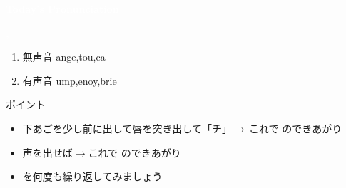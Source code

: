 \documentclass[aspectratio=169,xcolor={dvipsnames,table}]{beamer}
\begin{document}
\begin{frame}
\centering
  \textcolor{white}{\Huge\bfseries Today's Pronunciation}\pause

 \vspace{30pt}

  \textcolor{white}{\Huge\bfseries {}, }
\end{frame}
 \begin{frame}[plain]{}

\large

\begin{enumerate}
 \item  無声音 \hspace{20pt}ange,\hspace{1\zw}tou,\hspace{1\zw}ca
 \item  有声音 \hspace{20pt}ump,\hspace{1\zw}enoy,\hspace{1\zw}brie
\end{enumerate}

\vspace*{20pt}

\normalsize
ポイント

\begin{itemize}
 \item 下あごを少し前に出して唇を突き出して「チ」$\rightarrow$\,これで\,\,のできあがり 
 \item 声を出せば$\rightarrow$これで\,\,のできあがり
 \item {}を何度も繰り返してみましょう
\end{itemize}
\hfill{}
\end{frame}
\end{document}
